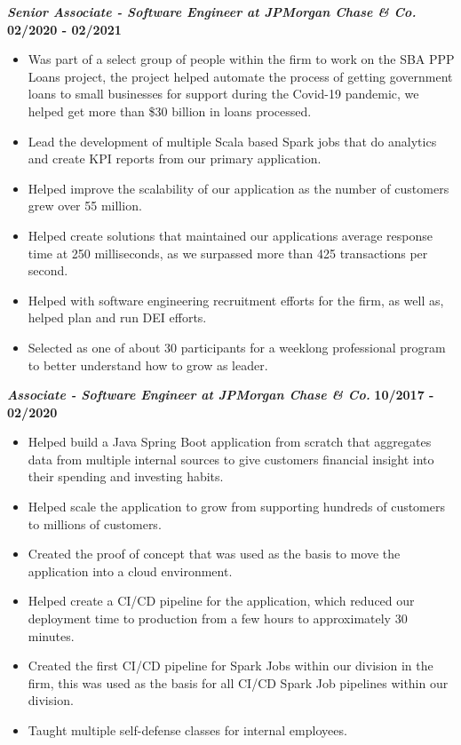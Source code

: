 \documentclass[10pt]{res}
\begin{document}
\begin{resume}
	\textbf{\textit{Senior Associate - Software Engineer at JPMorgan Chase \& Co.}}
	\hfill{\bf 02/2020 - 02/2021}
	\begin{itemize}
		\item Was part of a select group of people within the firm to work on the SBA PPP Loans project, the project helped automate the process of getting government loans to small businesses for support during the Covid-19
pandemic, we helped get more than \$30 billion in loans processed.
		\item Lead the development of multiple Scala based Spark jobs that do analytics and create KPI reports from our
primary application.
		\item Helped improve the scalability of our application as the number of customers grew over 55 million.
		\item Helped create solutions that maintained our applications average response time at 250 milliseconds, as we surpassed more than 425 transactions per second.
		\item Helped with software engineering recruitment efforts for the firm, as well as, helped plan and run DEI efforts.
		\item Selected as one of about 30 participants for a weeklong professional program to better understand how to grow
as leader.
	\end{itemize}

	\textbf{\textit{Associate - Software Engineer at JPMorgan Chase \& Co.}}
	\hfill{\bf 10/2017 - 02/2020}
	\begin{itemize}
		\item Helped build a Java Spring Boot application from scratch that aggregates data from multiple internal sources
to give customers financial insight into their spending and investing habits.
		\item Helped scale the application to grow from supporting hundreds of customers to millions of customers.
		\item Created the proof of concept that was used as the basis to move the application into a cloud environment.
		\item Helped create a CI/CD pipeline for the application, which reduced our deployment time to production from a few hours to approximately 30 minutes.
		\item Created the first CI/CD pipeline for Spark Jobs within our division in the firm, this was used as the basis for all CI/CD Spark Job pipelines within our division.
		\item Taught multiple self-defense classes for internal employees.
	\end{itemize}


\end{resume}
\end{document}
